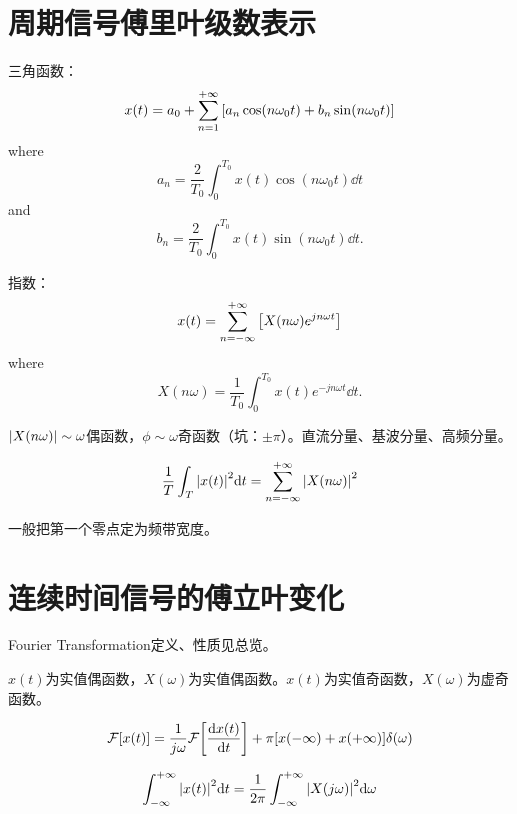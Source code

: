 \documentclass{article}
\def\ft{\mathcal{F}}
\begin{document}
\section{周期信号傅里叶级数表示}

\begin{thm}
	三角函数：\[x(t)=a_0+\sum_{n=1}^{+\infty}\qty[a_n\cos(n\omega_0t)+b_n\sin(n\omega_0t)]\]
	where
	\[
		a_n=\frac{2}{T_0}\int_0^{T_0}x(t)\cos(n\omega_0t)\dd t
	\] and 
	\[
		b_n=\frac{2}{T_0}\int_0^{T_0}x(t)\sin(n\omega_0t)\dd t
	.\] 
\end{thm}

\begin{thm}
	指数：
	\[
		x(t)=
		\sum_{n=-\infty}^{+\infty}
		\qty[X(n\omega)e^{jn\omega t}]
	\]
	where
	\[
		X(n\omega)=\frac{1}{T_0}\int_0^{T_0}x(t)e^{-jn\omega t}\dd t
	.\] 
\end{thm}

\begin{defi}
	$\abs{X(n\omega)}\sim\omega$偶函数，$\phi\sim\omega$奇函数（坑：$\pm\pi$）。直流分量、基波分量、高频分量。
\end{defi}

\begin{thm}[帕斯瓦尔定理]
    \[
		\frac{1}{T}\int_T\abs{x(t)}^2\dd t
		=
		\sum_{n=-\infty}^{+\infty}\abs{X(n\omega)}^2
    \] 
\end{thm}

\begin{defi}[频带宽度]
    一般把第一个零点定为频带宽度。
\end{defi}








\newpage
\section{连续时间信号的傅立叶变化}
Fourier Transformation定义、性质见总览。

\begin{thm}
	$x(t)$为实值偶函数，$X(\omega)$为实值偶函数。$x(t)$为实值奇函数，$X(\omega)$为虚奇函数。
    
\end{thm}

\begin{thm}
    \[
		\ft[x(t)]=\frac{1}{j\omega}\ft\qty[\dv{x(t)}{t}]+\pi\qty[x(-\infty)+x(+\infty)]\delta(\omega)
    \] 
\end{thm}

\begin{thm}[帕斯瓦尔定理]
    \[
		\int_{-\infty}^{+\infty}\abs{x(t)}^2\dd t=
		\frac{1}{2\pi}\int_{-\infty}^{+\infty}
		\abs{X(j\omega)}^2\dd\omega
    \] 
\end{thm}
\end{document}
